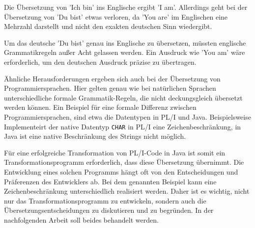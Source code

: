 Die Übersetzung von 'Ich bin' ins Englische ergibt 'I am'. Allerdings geht bei der Übersetzung von 'Du bist' etwas verloren, da 'You are' im Englischen eine Mehrzahl darstellt und nicht den exakten deutschen Sinn wiedergibt.

Um das deutsche 'Du bist' genau ins Englische zu übersetzen, müssten englische Grammatikregeln außer Acht gelassen werden. Ein Ausdruck wie 'You am' wäre erforderlich, um den deutschen Ausdruck präzise zu übertragen.

Ähnliche Herausforderungen ergeben sich auch bei der Übersetzung von Programmiersprachen. Hier gelten genau wie bei natürlichen Sprachen unterschiedliche formale Grammatik-Regeln, die nicht deckungsgleich übersetzt werden können. Ein Beispiel für eine formale Differenz zwischen Programmiersprachen, sind etwa die Datentypen in PL/I und Java. Beispielsweise Implementeirt der native Datentyp \verb!CHAR! in PL/I eine Zeichenbeschränkung, in Java ist eine native Beschränkung des Strings nicht möglich. 

Für eine erfolgreiche Transformation von PL/I-Code in Java ist somit ein Transformationsprogramm erforderlich, dass diese Übersetzung übernimmt. Die Entwicklung eines solchen Programms hängt oft von den Entscheidungen und Präferenzen des Entwicklers ab. Bei dem genannten Beispiel kann eine Zeichenbeschränkung unterschiedlich realisiert werden. Daher ist es wichtig, nicht nur das Transformationsprogramm zu entwickeln, sondern auch die Übersetzungsentscheidungen zu diskutieren und zu begründen. In der nachfolgenden Arbeit soll beides behandelt werden.
